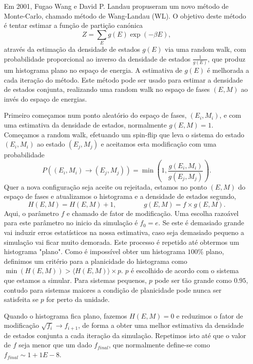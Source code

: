 \documentclass[12pt, a4paper]{article}
\begin{document}
	Em 2001, Fugao Wang e David P. Landau \cite{wl2001, wl2004} propuseram um novo método de Monte-Carlo, chamado método de Wang-Landau (WL). O objetivo deste método é tentar estimar a função de partição canónica 
\begin{equation}
	Z = \sum_E g(E) \exp(-\beta E),
\end{equation}
através da estimação da densidade de estados $g(E)$ via uma random walk, com probabilidade proporcional ao inverso da densidade de estados $\frac{1}{g(E)}$, que produz um histograma plano no espaço de energia. A estimativa de $g(E)$ é melhorada a cada iteração do método.
Este método pode ser usado para estimar a densidade de estados conjunta, realizando uma random walk no espaço de fases $(E, M)$ ao invés do espaço de energias. 

Primeiro começamos num ponto aleatório do espaço de fases, $(E_i, M_i)$,  e com uma estimativa da densidade de estados, normalmente $g(E, M)=1$. Começamos a random walk, efetuando um spin-flip que leva o sistema do estado $(E_i, M_i)$ ao estado $(E_j, M_j)$ e aceitamos esta modificação com uma probabilidade
\begin{equation}
	P((E_i, M_i) \rightarrow (E_j, M_j)) = \min\left(1, \frac{g(E_i, M_i)}{g(E_j, M_j)}\right).
\end{equation}
Quer a nova configuração seja aceite ou rejeitada, estamos no ponto $(E, M)$ do espaço de fases e atualizamos o histograma e a densidade de estados segundo,
\begin{equation*}
	H(E, M) = H(E,M)+1, \quad \quad \quad \quad g(E,M)=f \times g(E,M).
\end{equation*}
Aqui, o parâmetro $f$ e chamado de fator de modificação. Uma escolha razoável para este parâmetro no inicio da simulação é $f_0=e$. Se este é demasiado grande vai induzir erros estatísticos na nossa estimativa, caso seja demasiado pequeno a simulação vai ficar muito demorada. 
Este processo é repetido até obtermos um histograma "plano". Como é impossível obter um histograma $100\%$ plano, definimos um critério para a planicidade do histograma como $\min(H(E, M)) > \langle H(E, M) \rangle \times p$. $p$ é escolhido de acordo com o sistema que estamos a simular. Para sistemas pequenos, $p$ pode ser tão grande como $0.95$, contudo para sistemas maiores a condição de planicidade pode nunca ser satisfeita se $p$ for perto da unidade.

Quando o histograma fica plano, fazemos $H(E, M) = 0$ e reduzimos o fator de modificação $\sqrt{f_{i}} \rightarrow f_{i+1}$, de forma a obter uma melhor estimativa da densidade de estados conjunta a cada iteração da simulação. Repetimos isto até que o valor de $f$ seja menor que um dado $f_{final}$, que normalmente define-se como $f_{final}  \sim 1+1E-8$.
\end{document}
